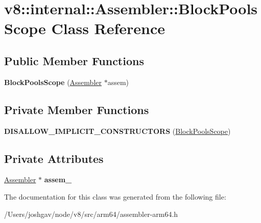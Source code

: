 \hypertarget{classv8_1_1internal_1_1_assembler_1_1_block_pools_scope}{}\section{v8\+:\+:internal\+:\+:Assembler\+:\+:Block\+Pools\+Scope Class Reference}
\label{classv8_1_1internal_1_1_assembler_1_1_block_pools_scope}
\subsection*{Public Member Functions}
\begin{DoxyCompactItemize}
\item 
{\bfseries Block\+Pools\+Scope} (\hyperlink{classv8_1_1internal_1_1_assembler}{Assembler} $\ast$assem)\hypertarget{classv8_1_1internal_1_1_assembler_1_1_block_pools_scope_a85f2cd5f7ee9aa1bc76fbf3e713c2f45}{}\label{classv8_1_1internal_1_1_assembler_1_1_block_pools_scope_a85f2cd5f7ee9aa1bc76fbf3e713c2f45}

\end{DoxyCompactItemize}
\subsection*{Private Member Functions}
\begin{DoxyCompactItemize}
\item 
{\bfseries D\+I\+S\+A\+L\+L\+O\+W\+\_\+\+I\+M\+P\+L\+I\+C\+I\+T\+\_\+\+C\+O\+N\+S\+T\+R\+U\+C\+T\+O\+RS} (\hyperlink{classv8_1_1internal_1_1_assembler_1_1_block_pools_scope}{Block\+Pools\+Scope})\hypertarget{classv8_1_1internal_1_1_assembler_1_1_block_pools_scope_ab42136d3283af62cf6cfe403795bb116}{}\label{classv8_1_1internal_1_1_assembler_1_1_block_pools_scope_ab42136d3283af62cf6cfe403795bb116}

\end{DoxyCompactItemize}
\subsection*{Private Attributes}
\begin{DoxyCompactItemize}
\item 
\hyperlink{classv8_1_1internal_1_1_assembler}{Assembler} $\ast$ {\bfseries assem\+\_\+}\hypertarget{classv8_1_1internal_1_1_assembler_1_1_block_pools_scope_a5e488574445a36fd126a7c71cbc20055}{}\label{classv8_1_1internal_1_1_assembler_1_1_block_pools_scope_a5e488574445a36fd126a7c71cbc20055}

\end{DoxyCompactItemize}


The documentation for this class was generated from the following file\+:\begin{DoxyCompactItemize}
\item 
/\+Users/joshgav/node/v8/src/arm64/assembler-\/arm64.\+h\end{DoxyCompactItemize}
